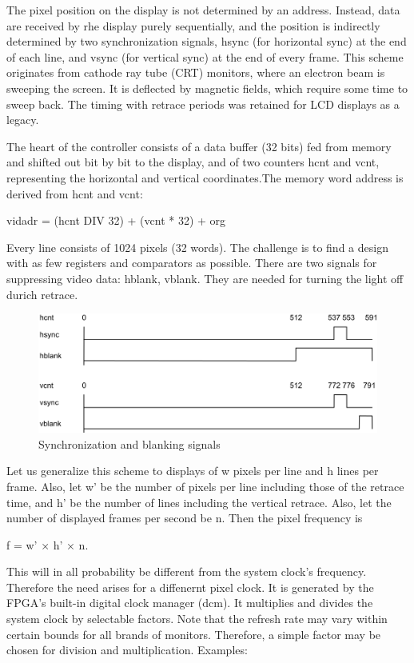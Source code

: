 The pixel position on the display is not determined by an address. Instead, data are received by rhe
display purely sequentially, and the position is indirectly determined by two synchronization signals,
hsync (for horizontal sync) at the end of each line, and vsync (for vertical sync) at the end of every
frame. This scheme originates from cathode ray tube (CRT) monitors, where an electron beam is
sweeping the screen. It is deflected by magnetic fields, which require some time to sweep back.
The timing with retrace periods was retained for LCD displays as a legacy.

The heart of the controller consists of a data buffer (32 bits) fed from memory and shifted out bit by
bit to the display, and of two counters hcnt and vcnt, representing the horizontal and vertical
coordinates.The memory word address is derived from hcnt and vcnt:

vidadr = (hcnt DIV 32) + (vcnt * 32) + org

Every line consists of 1024 pixels (32 words). The challenge is to find a design with as few registers
and comparators as possible. There are two signals for suppressing video data: hblank, vblank.
They are needed for turning the light off durich retrace.
\begin{figure}[h!]
  \centering
  \includegraphics[width=.96\textwidth]{i/G/9.png}
  \caption{Synchronization and blanking signals}
  \label{fig:syn}
\end{figure}

Let us generalize this scheme to displays of w pixels per line and h lines per frame. Also, let w' be
the number of pixels per line including those of the retrace time, and h' be the number of lines
including the vertical retrace. Also, let the number of displayed frames per second be n. Then the
pixel frequency is

f = w' × h' × n.

This will in all probability be different from the system clock's frequency. Therefore the need arises
for a diffenernt pixel clock. It is generated by the FPGA's built-in digital clock manager (dcm). It
multiplies and divides the system clock by selectable factors. Note that the refresh rate may vary
within certain bounds for all brands of monitors. Therefore, a simple factor may be chosen for
division and multiplication. Examples:


